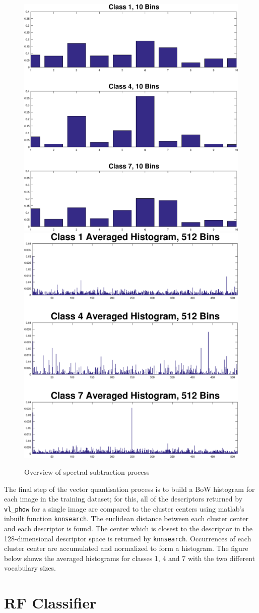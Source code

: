 \documentclass[a4paper,pra,twocolumn,10pt,aps,longbibliography,nobalancelastpage]{revtex4-1}
\begin{document}
\begin{figure}[H]
	\centering
    \includegraphics[width=0.49\columnwidth]{hist_10}
    \includegraphics[width=0.49\columnwidth]{hist_512}
    \caption{Overview of spectral subtraction process}
    \label{fig:hists}
\end{figure}


The final step of the vector quantisation process is to build a BoW histogram for each image in the training dataset; for this, all of the descriptors returned by \texttt{vl\_phow} for a single image are compared to the cluster centers using matlab's inbuilt function \texttt{knnsearch}. The euclidean distance between each cluster center and each descriptor is found. The center which is closest to the descriptor in the 128-dimensional descriptor space is returned by \texttt{knnsearch}. Occurrences of each cluster center are accumulated and normalized to form a histogram. The figure below shows the averaged histograms for classes 1, 4 and 7 with the two different vocabulary sizes. 


\section{RF Classifier}
\end{document}
